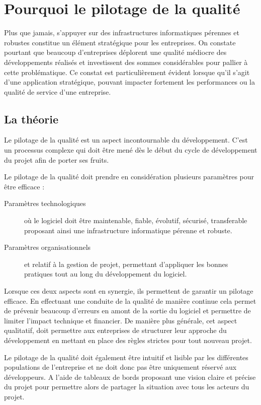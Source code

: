 \newpage

\section{Pourquoi le pilotage de la qualité}

Plus que jamais, s’appuyer sur des infrastructures informatiques pérennes et robustes constitue un élément stratégique pour les entreprises. 
On constate pourtant que beaucoup d’entreprises déplorent une qualité médiocre des développements réalisés et investissent des sommes considérables pour pallier à cette problématique. Ce constat est particulièrement évident lorsque qu’il s’agit d’une application stratégique, pouvant impacter fortement les performances ou la qualité de service d’une entreprise.


\subsection{La théorie}

Le pilotage de la qualité est un aspect incontournable du développement. 
C'est un processus complexe qui doit être mené dès le début du cycle de développement du projet afin de porter ses fruits. 

Le pilotage de la qualité doit prendre en considération plusieurs paramètres pour être efficace : 

\begin{description}
\item[Paramètres technologiques]{où le logiciel doit être maintenable, fiable, évolutif, sécurisé,
transferable proposant ainsi une infrastructure informatique pérenne et robuste.} 
\item[Paramètres organisationnels]{et relatif à la gestion de projet, permettant d'appliquer les bonnes pratiques tout au long du développement du logiciel.} 
\end{description}

\newpage

Lorsque ces deux aspects sont en synergie, ils permettent de garantir un pilotage efficace. 
En effectuant une conduite de la qualité de manière continue cela permet de prévenir beaucoup d'erreurs en amont de la sortie du logiciel et permettre de limiter l'impact technique et financier. 
De manière plus générale, cet aspect qualitatif, doit permettre aux entreprises de structurer leur approche du développement en mettant en place des règles strictes pour tout nouveau projet. 

Le pilotage de la qualité doit également être intuitif et lisible par les différentes populations de l'entreprise et ne doit donc pas être uniquement réservé aux développeurs. 
A l'aide de tableaux de bords proposant une vision claire et précise du projet pour permettre alors de partager la situation avec tous les acteurs du projet. 

